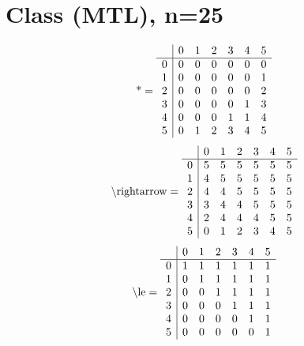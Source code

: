 \documentclass[11pt]{article}
\begin{document}
\section{Class (MTL), n=25}
\[\text{*} = 
\begin{array}{r | r r r r r r}
 & 0 & 1 & 2 & 3 & 4 & 5 \\ \hline
0 & 0 & 0 & 0 & 0 & 0 & 0 \\
1 & 0 & 0 & 0 & 0 & 0 & 1 \\
2 & 0 & 0 & 0 & 0 & 0 & 2 \\
3 & 0 & 0 & 0 & 0 & 1 & 3 \\
4 & 0 & 0 & 0 & 1 & 1 & 4 \\
5 & 0 & 1 & 2 & 3 & 4 & 5 \\
\end{array}
\]
\[\text{\textbackslash rightarrow} = 
\begin{array}{r | r r r r r r}
 & 0 & 1 & 2 & 3 & 4 & 5 \\ \hline
0 & 5 & 5 & 5 & 5 & 5 & 5 \\
1 & 4 & 5 & 5 & 5 & 5 & 5 \\
2 & 4 & 4 & 5 & 5 & 5 & 5 \\
3 & 3 & 4 & 4 & 5 & 5 & 5 \\
4 & 2 & 4 & 4 & 4 & 5 & 5 \\
5 & 0 & 1 & 2 & 3 & 4 & 5 \\
\end{array}
\]
\[\text{\textbackslash le} = 
\begin{array}{r | r r r r r r}
 & 0 & 1 & 2 & 3 & 4 & 5 \\ \hline
0 & 1 & 1 & 1 & 1 & 1 & 1 \\
1 & 0 & 1 & 1 & 1 & 1 & 1 \\
2 & 0 & 0 & 1 & 1 & 1 & 1 \\
3 & 0 & 0 & 0 & 1 & 1 & 1 \\
4 & 0 & 0 & 0 & 0 & 1 & 1 \\
5 & 0 & 0 & 0 & 0 & 0 & 1 \\
\end{array}
\]
\end{document}
